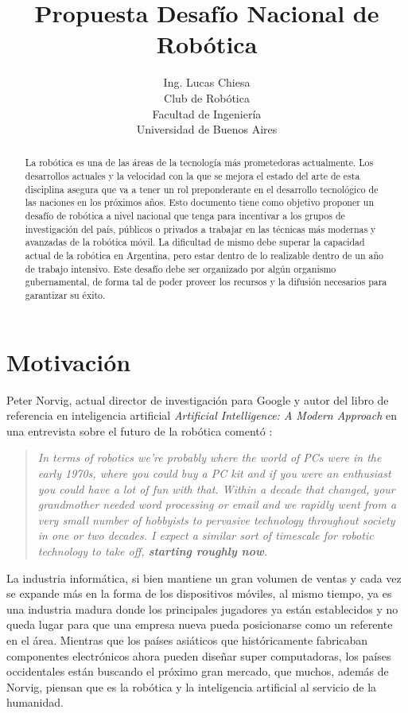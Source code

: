 \documentclass[a4paper,12pt]{article}
\author{Ing. Lucas Chiesa \\ Club de Robótica \\ Facultad de Ingeniería \\ Universidad de Buenos Aires}
\title{Propuesta Desafío Nacional de Robótica}
\begin{document}


\begin{abstract}
 La robótica es una de las áreas de la tecnología más prometedoras actualmente. Los desarrollos actuales y la velocidad con la que se mejora el estado del arte de esta disciplina asegura que va a tener un rol preponderante en el desarrollo tecnológico de las naciones en los próximos años.
 Esto documento tiene como objetivo proponer un desafío de robótica a nivel nacional que tenga para incentivar a los grupos de investigación del país, públicos o privados a trabajar en las técnicas más modernas y avanzadas de la robótica móvil. La dificultad de mismo debe superar la capacidad actual de la robótica en Argentina, pero estar dentro de lo realizable dentro de un año de trabajo intensivo. Este desafío debe ser organizado por algún organismo gubernamental, de forma tal de poder proveer los recursos y la difusión necesarios para garantizar su éxito.
\end{abstract}

\newpage
\section{Motivación}

Peter Norvig\cite{norvig-cv}, actual director de investigación para Google y autor del libro de referencia en inteligencia artificial \textit{Artificial Intelligence: A Modern Approach} en una entrevista sobre el futuro de la robótica comentó \cite{norvig-cita}:

\begin{quote}
\textit{In terms of robotics we're probably where the world of PCs were in the early 1970s, where you could buy a PC kit and if you were an enthusiast you could have a lot of fun with that. Within a decade that changed, your grandmother needed word processing or email and we rapidly went from a very small number of hobbyists to pervasive technology throughout society in one or two decades. I expect a similar sort of timescale for robotic technology to take off, \textbf{starting roughly now}.}
\end{quote}

La industria informática, si bien mantiene un gran volumen de ventas y cada vez se expande más en la forma de los dispositivos móviles, al mismo tiempo, ya es una industria madura donde los principales jugadores ya están establecidos y no queda lugar para que una empresa nueva pueda posicionarse como un referente en el área. Mientras que los países asiáticos que históricamente fabricaban componentes electrónicos ahora pueden diseñar super computadoras\cite{spectrum-china}, los países occidentales están buscando el próximo gran mercado, que muchos, además de Norvig, piensan que es la robótica y la inteligencia artificial al servicio de la humanidad\cite{ros-spur}\cite{redwood}\cite{wg-irobot}.
\end{document}
